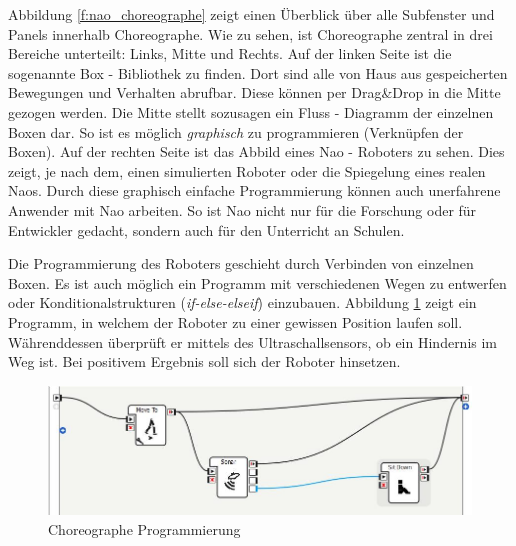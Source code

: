 Abbildung \ref{f:nao_choreographe} zeigt einen Überblick über alle Subfenster und Panels innerhalb Choreographe. Wie zu sehen, ist Choreographe zentral in drei Bereiche unterteilt: Links, Mitte und Rechts.
Auf der linken Seite ist die sogenannte Box - Bibliothek zu finden. Dort sind alle von Haus aus gespeicherten Bewegungen und Verhalten abrufbar. Diese können per Drag\&Drop in die Mitte gezogen werden. Die Mitte stellt sozusagen ein Fluss - Diagramm der einzelnen Boxen dar. So ist es möglich \textit{graphisch} zu programmieren (Verknüpfen der Boxen). Auf der rechten Seite ist das Abbild eines Nao - Roboters zu sehen. Dies zeigt, je nach dem, einen simulierten Roboter oder die Spiegelung eines realen Naos. 
Durch diese graphisch einfache Programmierung können auch unerfahrene Anwender mit Nao arbeiten. So ist Nao nicht nur für die Forschung oder für Entwickler gedacht, sondern auch für den Unterricht an Schulen.

Die Programmierung des Roboters geschieht durch Verbinden von einzelnen Boxen. Es ist auch möglich ein Programm mit verschiedenen Wegen zu entwerfen oder Konditionalstrukturen (\textit{if-else-elseif}) einzubauen. Abbildung \ref{f:nao_choreographeProg} zeigt ein Programm, in welchem der Roboter zu einer gewissen Position laufen soll. Währenddessen überprüft er mittels des Ultraschallsensors, ob ein Hindernis im Weg ist. Bei positivem Ergebnis soll sich der Roboter hinsetzen.

\begin{figure}[H]						
	\centering							
	\includegraphics[scale=.6]{Bilder/choreographe_prog.jpg}			
	\caption{Choreographe Programmierung}						
	\label{f:nao_choreographeProg}						
\end{figure}

